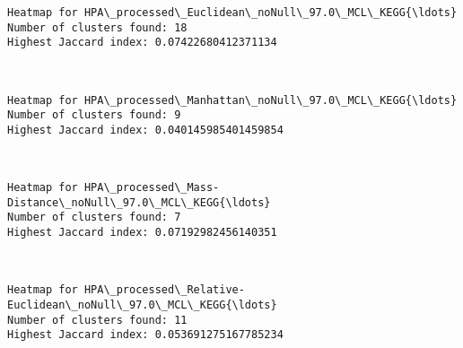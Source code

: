 \documentclass[11pt]{article}
\begin{document}
    \begin{Verbatim}[commandchars=\\\{\}]
Heatmap for HPA\_processed\_Euclidean\_noNull\_97.0\_MCL\_KEGG{\ldots}
Number of clusters found: 18
Highest Jaccard index: 0.07422680412371134

    \end{Verbatim}

    \begin{center}
    \end{center}
    { \hspace*{\fill} \\}
    
    \begin{Verbatim}[commandchars=\\\{\}]
Heatmap for HPA\_processed\_Manhattan\_noNull\_97.0\_MCL\_KEGG{\ldots}
Number of clusters found: 9
Highest Jaccard index: 0.040145985401459854

    \end{Verbatim}

    \begin{center}
    \end{center}
    { \hspace*{\fill} \\}
    
    \begin{Verbatim}[commandchars=\\\{\}]
Heatmap for HPA\_processed\_Mass-Distance\_noNull\_97.0\_MCL\_KEGG{\ldots}
Number of clusters found: 7
Highest Jaccard index: 0.07192982456140351

    \end{Verbatim}

    \begin{center}
    \end{center}
    { \hspace*{\fill} \\}
    
    \begin{Verbatim}[commandchars=\\\{\}]
Heatmap for HPA\_processed\_Relative-Euclidean\_noNull\_97.0\_MCL\_KEGG{\ldots}
Number of clusters found: 11
Highest Jaccard index: 0.053691275167785234

    \end{Verbatim}
\end{document}

